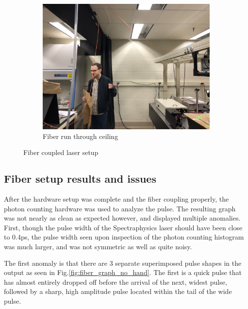 \documentclass[a4paper]{article}
\begin{document}
\begin{figure}
\begin{subfigure}[t]{0.4\textwidth}
         \includegraphics[width=\textwidth]{figures/IMG_6137.jpg}
         \caption{Fiber run through ceiling}
         \label{fig:fiber_ceiling}
         \begin{minipage}{2cm}
         \vfill
         \end{minipage}
     \end{subfigure}
        \caption{Fiber coupled laser setup}
        \label{fig:fiber}
\end{figure}

\subsection{Fiber setup results and issues}

After the hardware setup was complete and the fiber coupling properly, the photon counting hardware was used to analyze the pulse. The resulting graph was not nearly as clean as expected however, and displayed multiple anomalies. First, though the pulse width of the Spectraphysics laser should have been close to 0.4ps, the pulse width seen upon inspection of the photon counting histogram was much larger, and was not symmetric as well as quite noisy.

The first anomaly is that there are 3 separate superimposed pulse shapes in the output as seen in Fig.\ref{fig:fiber_graph_no_hand}. The first is a quick pulse that has almost entirely dropped off before the arrival of the next, widest pulse, followed by a sharp, high amplitude pulse located within the tail of the wide pulse. 
\end{document}
